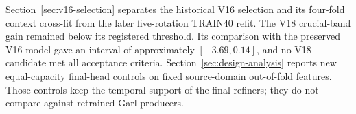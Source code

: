 Section~\ref{sec:v16-selection} separates the historical V16 selection and its four-fold context cross-fit from the later five-rotation TRAIN40 refit. The V18 crucial-band gain remained below its registered threshold. Its comparison with the preserved V16 model gave an interval of approximately $[-3.69,0.14]$, and no V18 candidate met all acceptance criteria. Section~\ref{sec:design-analysis} reports new equal-capacity final-head controls on fixed source-domain out-of-fold features. Those controls keep the temporal support of the final refiners; they do not compare against retrained Garl producers.
\FloatBarrier
